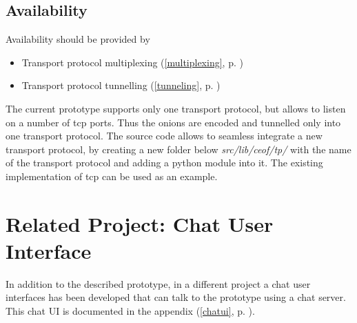 \subsection{Availability}
Availability should be provided by
\begin{itemize}
\item Transport protocol multiplexing (\ref{multiplexing}, p. \pageref{multiplexing})
\item Transport protocol tunnelling (\ref{tunneling}, p. \pageref{tunneling})
\end{itemize}
The current prototype supports only one transport protocol, but allows to listen on
a number of tcp ports. Thus the onions are encoded and tunnelled only into
one transport protocol. The source code allows to seamless integrate a new
transport protocol, by creating a new folder below
\textit{src/lib/ceof/tp/} with the name of the transport protocol and adding
a python module into it. The existing implementation of tcp can be used
as an example.
\section{Related Project: Chat User Interface}
In addition to the described prototype, in a different
project a chat user interfaces has been
developed that can talk to the prototype using a chat server.
This chat UI is documented in the appendix (\ref{chatui}, p. \pageref{chatui}).
